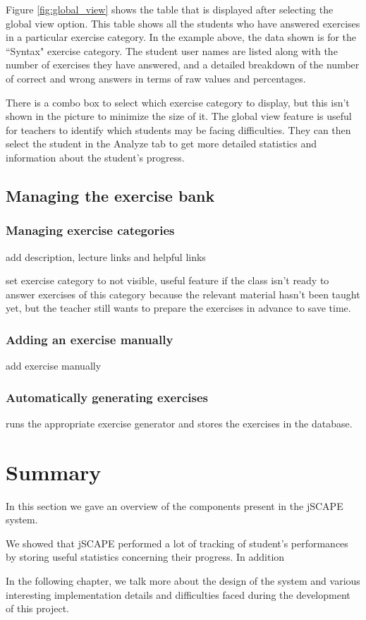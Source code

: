Figure \ref{fig:global_view} shows the table that is displayed after selecting the global view option. This table shows all the students who have answered exercises in a particular exercise category. In the example above, the data shown is for the ``Syntax" exercise category. The student user names are listed along with the number of exercises they have answered, and a detailed breakdown of the number of correct and wrong answers in terms of raw values and percentages. \newline

There is a combo box to select which exercise category to display, but this isn't shown in the picture to minimize the size of it. The global view feature is useful for teachers to identify which students may be facing difficulties. They can then select the student in the Analyze tab to get more detailed statistics and information about the student's progress.

\subsection{Managing the exercise bank}
\subsubsection{Managing exercise categories}
add description, lecture links and helpful links

set exercise category to not visible, useful feature if the class isn't ready to answer exercises of this category because the relevant material hasn't been taught yet, but the teacher still wants to prepare the exercises in advance to save time.

\subsubsection{Adding an exercise manually}
add exercise manually

\subsubsection{Automatically generating exercises}
runs the appropriate exercise generator and stores the exercises in the database.


\section{Summary}
In this section we gave an overview of the components present in the jSCAPE system. 

We showed that jSCAPE performed a lot of tracking of student's performances by storing useful statistics concerning their progress. In addition\newline

In the following chapter, we talk more about the design of the system and various interesting implementation details and difficulties faced during the development of this project.

